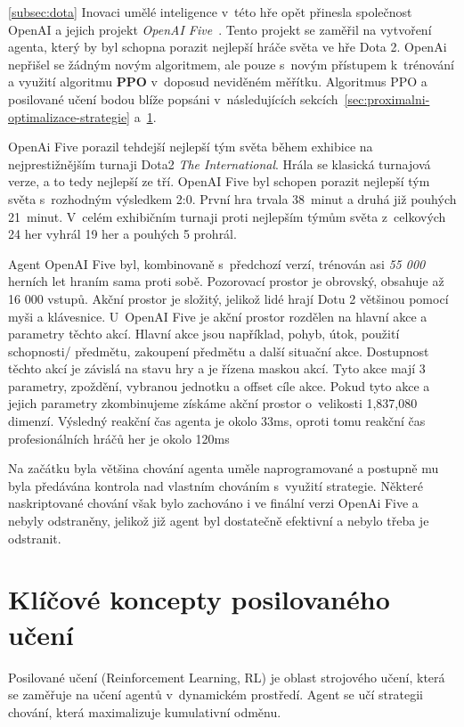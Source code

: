 \ref{subsec:dota}
Inovaci umělé inteligence v~této hře opět přinesla společnost OpenAI a jejich projekt \emph{OpenAI Five}~\cite{Dota2}.
Tento projekt se zaměřil na vytvoření agenta, který by byl schopna porazit nejlepší hráče světa ve hře Dota 2.
OpenAi nepřišel se žádným novým algoritmem, ale pouze s~novým přístupem k~trénování a využití algoritmu \textbf{PPO} v~doposud neviděném měřítku. 
Algoritmus PPO a posilované učení bodou blíže popsáni v~následujících sekcích~\ref{sec:proximalni-optimalizace-strategie} a~\ref{sec:klicove-koncepty-posilovaneho-uceni}.

OpenAi Five porazil tehdejší nejlepší tým světa během exhibice na nejprestižnějším turnaji Dota2 \textit{The International}.
Hrála se klasická turnajová verze, a to tedy nejlepší ze tří.
OpenAI Five byl schopen porazit nejlepší tým světa s~rozhodným výsledkem 2:0.
První hra trvala 38~minut a druhá již pouhých 21~minut.
V~celém exhibičním turnaji proti nejlepším týmům světa z~celkových 24 her vyhrál 19 her a pouhých 5 prohrál.

Agent OpenAI Five byl, kombinovaně s~předchozí verzí, trénován asi \emph{55 000} herních let hraním sama proti sobě.
Pozorovací prostor je obrovský, obsahuje až 16 000 vstupů.
Akční prostor je složitý, jelikož lidé hrají Dotu 2 většinou pomocí myši a klávesnice.
U~OpenAI Five je akční prostor rozdělen na hlavní akce a parametry těchto akcí.
Hlavní akce jsou například, pohyb, útok, použití schopnosti/ předmětu, zakoupení předmětu a další situační akce.
Dostupnost těchto akcí je závislá na stavu hry a je řízena maskou akcí.
Tyto akce mají 3 parametry, zpoždění, vybranou jednotku a offset cíle akce.
Pokud tyto akce a jejich parametry zkombinujeme získáme akční prostor o~velikosti 1,837,080 dimenzí.
Výsledný reakční čas agenta je okolo 33ms, oproti tomu reakční čas profesionálních hráčů her je okolo 120ms~\cite{reaction_time}

Na začátku byla většina chování agenta uměle naprogramované a postupně mu byla předávána kontrola nad vlastním chováním s~využití strategie.
Některé naskriptované chování však bylo zachováno i ve finální verzi OpenAi Five a nebyly odstraněny, jelikož již agent byl dostatečně efektivní a nebylo třeba je odstranit.

\section{Klíčové koncepty posilovaného učení}\label{sec:klicove-koncepty-posilovaneho-uceni}
Posilované učení (Reinforcement Learning, RL) je oblast strojového učení, která se zaměřuje na učení agentů v~dynamickém prostředí.
Agent se učí strategii chování, která maximalizuje kumulativní odměnu.

